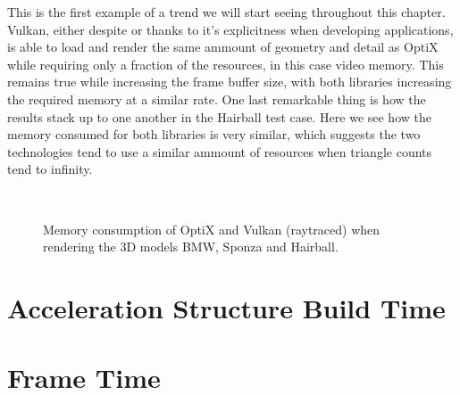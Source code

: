This is the first example of a trend we will start seeing throughout this chapter. Vulkan, either despite or thanks to it's explicitness when developing applications, is able to load and render the same ammount of geometry and detail as OptiX while requiring only a fraction of the resources, in this case video memory. This remains true while increasing the frame buffer size, with both libraries increasing the required memory at a similar rate. One last remarkable thing is how the results stack up to one another in the Hairball test case. Here we see how the memory consumed for both libraries is very similar, which suggests the two technologies tend to use a similar ammount of resources when triangle counts tend to infinity.

\begin{figure}
    \\
    \centering
    \caption{Memory consumption of OptiX and Vulkan (raytraced) when rendering the 3D models BMW, Sponza and Hairball.}
    \label{memory-usage-raytraced-comparison-graph}
\end{figure}
\section{Acceleration Structure Build Time}
\section{Frame Time}

